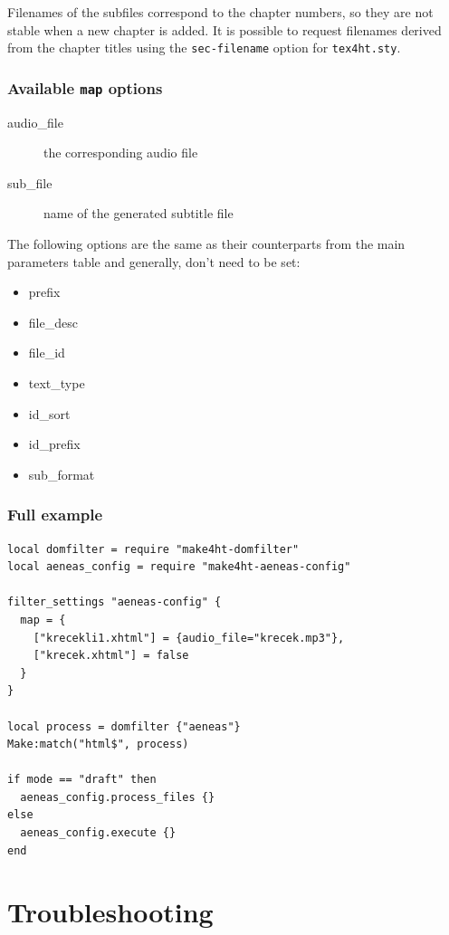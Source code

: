 Filenames of the subfiles correspond to the chapter numbers, so they are
not stable when a new chapter is added. It is possible to request
filenames derived from the chapter titles using the
\texttt{sec-filename} option for \texttt{tex4ht.sty}.

\subsubsection{\texorpdfstring{Available \texttt{map}
options}{Available map options}}\label{available-map-options}

\begin{description}
\item[audio\_file]
the corresponding audio file
\item[sub\_file]
name of the generated subtitle file
\end{description}

The following options are the same as their counterparts from the main
parameters table and generally, don't need to be set:

\begin{itemize}
\tightlist
\item
  prefix
\item
  file\_desc
\item
  file\_id
\item
  text\_type
\item
  id\_sort
\item
  id\_prefix
\item
  sub\_format
\end{itemize}

\subsubsection{Full example}\label{full-example}

\begin{verbatim}
local domfilter = require "make4ht-domfilter"
local aeneas_config = require "make4ht-aeneas-config"

filter_settings "aeneas-config" {
  map = {
    ["krecekli1.xhtml"] = {audio_file="krecek.mp3"}, 
    ["krecek.xhtml"] = false
  }
}

local process = domfilter {"aeneas"}
Make:match("html$", process)

if mode == "draft" then
  aeneas_config.process_files {}
else
  aeneas_config.execute {}
end
\end{verbatim}

\section{Troubleshooting}\label{troubleshooting}


